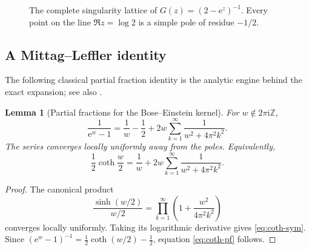 \documentclass[11pt,a4paper]{article}
\newtheorem{lemma}[theorem]{Lemma}
\theoremstyle{definition}
\theoremstyle{remark}
\newcommand{\e}{\mathrm e}
\newcommand{\ii}{\mathrm i}
\newcommand{\Z}{\mathbb Z}
\begin{document}
\begin{figure}[ht]
\centering
{}
\caption{The complete singularity lattice of \(G(z)=(2-\e^z)^{-1}\).
Every point on the line \(\Re z=\log2\) is a simple pole of residue \(-1/2\).}
\label{fig:poles}
\end{figure}

\subsection{A Mittag--Leffler identity}

The following classical partial fraction identity is the analytic engine behind
the exact expansion; see also \cite{WhittakerWatson}.

\begin{lemma}[Partial fractions for the Bose--Einstein kernel]\label{lem:coth}
For \(w\notin2\pi\ii\Z\),
\begin{equation}\label{eq:coth-pf}
 \frac1{\e^w-1}
 =\frac1w-\frac12
  +2w\sum_{k=1}^{\infty}\frac1{w^2+4\pi^2k^2}.
\end{equation}
The series converges locally uniformly away from the poles.  Equivalently,
\begin{equation}\label{eq:coth-sym}
 \frac12\coth\frac w2
 =\frac1w+2w\sum_{k=1}^{\infty}\frac1{w^2+4\pi^2k^2}.
\end{equation}
\end{lemma}

\begin{proof}
The canonical product
\[
 \frac{\sinh(w/2)}{w/2}
 =\prod_{k=1}^{\infty}
   \left(1+\frac{w^2}{4\pi^2k^2}\right)
\]
converges locally uniformly.  Taking its logarithmic derivative gives
\eqref{eq:coth-sym}.  Since
\(
 (\e^w-1)^{-1}=\tfrac12\coth(w/2)-\tfrac12
\), equation \eqref{eq:coth-pf} follows.
\end{proof}
\end{document}
